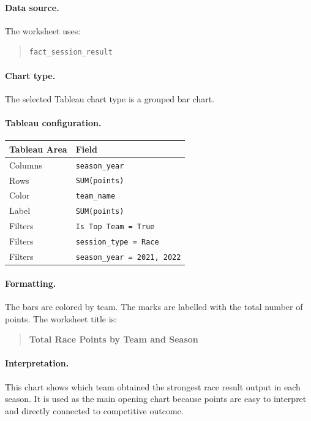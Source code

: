 \documentclass[12pt,a4paper]{article}
\begin{document}
	\paragraph{Data source.}
	The worksheet uses:
	
	\begin{quote}
		\texttt{fact\_session\_result}
	\end{quote}
	
	\paragraph{Chart type.}
	The selected Tableau chart type is a grouped bar chart.
	
	\paragraph{Tableau configuration.}
	
	\begin{longtable}{p{5cm} p{8cm}}
		\toprule
		\textbf{Tableau Area} & \textbf{Field} \\
		\midrule
		Columns & \texttt{season\_year} \\
		Rows & \texttt{SUM(points)} \\
		Color & \texttt{team\_name} \\
		Label & \texttt{SUM(points)} \\
		Filters & \texttt{Is Top Team = True} \\
		Filters & \texttt{session\_type = Race} \\
		Filters & \texttt{season\_year = 2021, 2022} \\
		\bottomrule
	\end{longtable}
	
	\paragraph{Formatting.}
	The bars are colored by team.
	The marks are labelled with the total number of points.
	The worksheet title is:
	
	\begin{quote}
		\textbf{Total Race Points by Team and Season}
	\end{quote}
	
	\paragraph{Interpretation.}
	This chart shows which team obtained the strongest race result output in each season.
	It is used as the main opening chart because points are easy to interpret and directly connected to competitive outcome.
	
\end{document}
